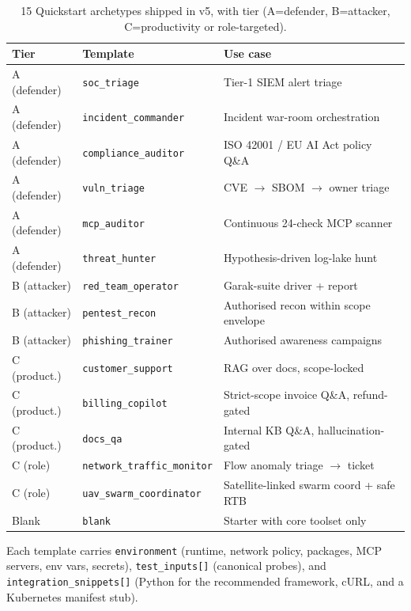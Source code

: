 \documentclass[11pt,a4paper]{article}
\begin{document}
\begin{table}[H]\centering
\small
\begin{tabular}{@{}llp{6.5cm}@{}}
\toprule
Tier & Template & Use case \\
\midrule
A (defender)  & \texttt{soc\_triage}          & Tier-1 SIEM alert triage \\
A (defender)  & \texttt{incident\_commander}  & Incident war-room orchestration \\
A (defender)  & \texttt{compliance\_auditor}  & ISO 42001 / EU AI Act policy Q\&A \\
A (defender)  & \texttt{vuln\_triage}         & CVE $\to$ SBOM $\to$ owner triage \\
A (defender)  & \texttt{mcp\_auditor}         & Continuous 24-check MCP scanner \\
A (defender)  & \texttt{threat\_hunter}       & Hypothesis-driven log-lake hunt \\
B (attacker)  & \texttt{red\_team\_operator}  & Garak-suite driver + report \\
B (attacker)  & \texttt{pentest\_recon}       & Authorised recon within scope envelope \\
B (attacker)  & \texttt{phishing\_trainer}    & Authorised awareness campaigns \\
C (product.)  & \texttt{customer\_support}    & RAG over docs, scope-locked \\
C (product.)  & \texttt{billing\_copilot}     & Strict-scope invoice Q\&A, refund-gated \\
C (product.)  & \texttt{docs\_qa}             & Internal KB Q\&A, hallucination-gated \\
C (role)      & \texttt{network\_traffic\_monitor} & Flow anomaly triage $\to$ ticket \\
C (role)      & \texttt{uav\_swarm\_coordinator} & Satellite-linked swarm coord + safe RTB \\
Blank         & \texttt{blank}                & Starter with core toolset only \\
\bottomrule
\end{tabular}
\caption{15 Quickstart archetypes shipped in v5, with tier
(A=defender, B=attacker, C=productivity or role-targeted).}
\end{table}

Each template carries \texttt{environment} (runtime, network policy,
packages, MCP servers, env vars, secrets), \texttt{test\_inputs[]}
(canonical probes), and \texttt{integration\_snippets[]} (Python for
the recommended framework, cURL, and a Kubernetes manifest stub).
\end{document}
